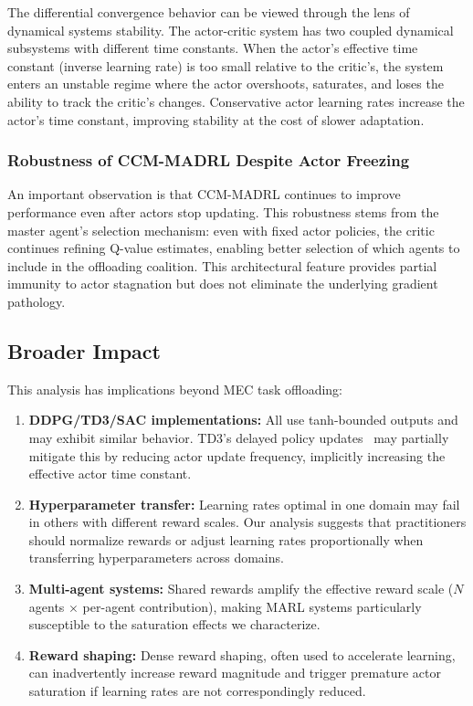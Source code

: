 The differential convergence behavior can be viewed through the lens of dynamical systems stability. The actor-critic system has two coupled dynamical subsystems with different time constants. When the actor's effective time constant (inverse learning rate) is too small relative to the critic's, the system enters an unstable regime where the actor overshoots, saturates, and loses the ability to track the critic's changes. Conservative actor learning rates increase the actor's time constant, improving stability at the cost of slower adaptation.

\subsubsection{Robustness of CCM-MADRL Despite Actor Freezing}

An important observation is that CCM-MADRL continues to improve performance even after actors stop updating. This robustness stems from the master agent's selection mechanism: even with fixed actor policies, the critic continues refining Q-value estimates, enabling better selection of which agents to include in the offloading coalition. This architectural feature provides partial immunity to actor stagnation but does not eliminate the underlying gradient pathology.

\subsection{Broader Impact}

This analysis has implications beyond MEC task offloading:

\begin{enumerate}
    \item \textbf{DDPG/TD3/SAC implementations:} All use tanh-bounded outputs and may exhibit similar behavior. TD3's delayed policy updates~\cite{fujimoto2018addressing} may partially mitigate this by reducing actor update frequency, implicitly increasing the effective actor time constant.

    \item \textbf{Hyperparameter transfer:} Learning rates optimal in one domain may fail in others with different reward scales. Our analysis suggests that practitioners should normalize rewards or adjust learning rates proportionally when transferring hyperparameters across domains.

    \item \textbf{Multi-agent systems:} Shared rewards amplify the effective reward scale ($N$ agents $\times$ per-agent contribution), making MARL systems particularly susceptible to the saturation effects we characterize.

    \item \textbf{Reward shaping:} Dense reward shaping, often used to accelerate learning, can inadvertently increase reward magnitude and trigger premature actor saturation if learning rates are not correspondingly reduced.
\end{enumerate}

